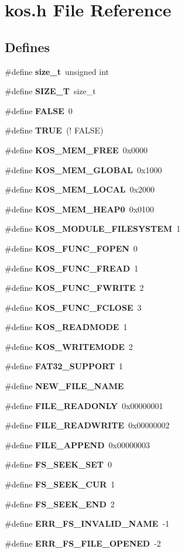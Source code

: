 \section{kos.h File Reference}
\label{kos_8h}
\subsection*{Defines}
\begin{CompactItemize}
\item 
\#define {\bf size\_\-t}\ unsigned int
\item 
\#define {\bf SIZE\_\-T}\ size\_\-t
\item 
\#define {\bf FALSE}\ 0
\item 
\#define {\bf TRUE}\ (! FALSE)
\item 
\#define {\bf KOS\_\-MEM\_\-FREE}\ 0x0000
\item 
\#define {\bf KOS\_\-MEM\_\-GLOBAL}\ 0x1000
\item 
\#define {\bf KOS\_\-MEM\_\-LOCAL}\ 0x2000
\item 
\#define {\bf KOS\_\-MEM\_\-HEAP0}\ 0x0100
\item 
\#define {\bf KOS\_\-MODULE\_\-FILESYSTEM}\ 1
\item 
\#define {\bf KOS\_\-FUNC\_\-FOPEN}\ 0
\item 
\#define {\bf KOS\_\-FUNC\_\-FREAD}\ 1
\item 
\#define {\bf KOS\_\-FUNC\_\-FWRITE}\ 2
\item 
\#define {\bf KOS\_\-FUNC\_\-FCLOSE}\ 3
\item 
\#define {\bf KOS\_\-READMODE}\ 1
\item 
\#define {\bf KOS\_\-WRITEMODE}\ 2
\item 
\#define {\bf FAT32\_\-SUPPORT}\ 1
\item 
\#define {\bf NEW\_\-FILE\_\-NAME}
\item 
\#define {\bf FILE\_\-READONLY}\ 0x00000001
\item 
\#define {\bf FILE\_\-READWRITE}\ 0x00000002
\item 
\#define {\bf FILE\_\-APPEND}\ 0x00000003
\item 
\#define {\bf FS\_\-SEEK\_\-SET}\ 0
\item 
\#define {\bf FS\_\-SEEK\_\-CUR}\ 1
\item 
\#define {\bf FS\_\-SEEK\_\-END}\ 2
\item 
\#define {\bf ERR\_\-FS\_\-INVALID\_\-NAME}\ -1
\item 
\#define {\bf ERR\_\-FS\_\-FILE\_\-OPENED}\ -2

\end{CompactItemize}
